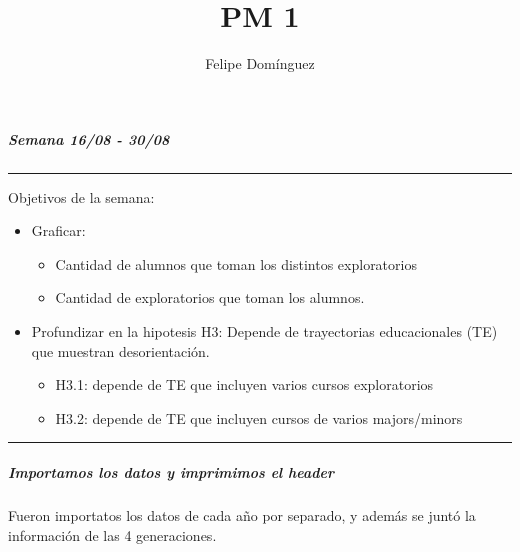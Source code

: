 \documentclass[]{article}
\title{PM 1}
\author{Felipe Domínguez}
\date{}
\providecommand{\tightlist}{%
  \setlength{\itemsep}{0pt}\setlength{\parskip}{0pt}}
\let\oldsubparagraph\subparagraph
\renewcommand{\subparagraph}[1]{\oldsubparagraph{#1}\mbox{}}
\begin{document}
\maketitle

\subparagraph{Semana 16/08 - 30/08}\label{semana-1608---3008}

\begin{center}\rule{0.5\linewidth}{\linethickness}\end{center}

Objetivos de la semana:

\begin{itemize}
\item
  Graficar:

  \begin{itemize}
  \tightlist
  \item
    Cantidad de alumnos que toman los distintos exploratorios\\
  \item
    Cantidad de exploratorios que toman los alumnos.
  \end{itemize}
\end{itemize}

\newline

\begin{itemize}
\item
  Profundizar en la hipotesis H3: Depende de trayectorias educacionales
  (TE) que muestran desorientación.

  \begin{itemize}
  \tightlist
  \item
    H3.1: depende de TE que incluyen varios cursos exploratorios\\
  \item
    H3.2: depende de TE que incluyen cursos de varios majors/minors
  \end{itemize}
\end{itemize}

\begin{center}\rule{0.5\linewidth}{\linethickness}\end{center}

\newline

\subparagraph{Importamos los datos y imprimimos el
header}\label{importamos-los-datos-y-imprimimos-el-header}

Fueron importatos los datos de cada año por separado, y además se juntó
la información de las 4 generaciones.
\end{document}
